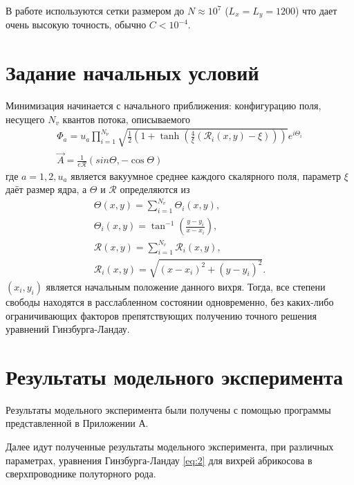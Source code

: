 В работе используются сетки размером до \( N \approx 10^7 \) 
(\( L_x = L_y = 1200 \)) что дает очень высокую точность, обычно 
\( C < 10^{-4} \). \cite{bib:minimization}

\section{Задание начальных условий}

Минимизация начинается с начального приближения: конфигурацию поля, несущего
\( N_v \) квантов потока, описываемого
\begin{gather}
    \Phi_a = u_a \prod\limits_{i=1}^{N_\nu} \sqrt{ 
        \frac{1}{2}\left( 1 + \tanh\left( 
            \frac{4}{\xi}\left( \mathcal{R}_i(x,y) - \xi \right)
        \right) \right)
    } e^{i\Theta_i}
    \nonumber \\
    \vec{A} = \frac{1}{e\mathcal{R}}\left( sin\Theta, -\cos\Theta \right)
    \label{eqm:6}
\end{gather}
где \( a = 1,2, u_a \) является вакуумное среднее каждого скалярного поля, 
параметр \( \xi \) даёт размер ядра, а \( \Theta \) и
\( \mathcal{R} \) определяются из
\begin{gather}
    \Theta(x,y) = \sum\limits_{i=1}^{N_v} \Theta_i(x,y), \nonumber \\
    \Theta_i(x,y) = \tan^{-1}\left(\frac{y-y_i}{x-x_i} \right), \nonumber \\
    \mathcal{R}(x,y) = \sum\limits_{i=1}^{N_v} \mathcal{R}_i(x,y), \nonumber \\
    \mathcal{R}_i(x,y) = \sqrt{(x-x_i)^2+(y-y_i)^2}.
\end{gather}
\( (x_i,y_i) \) является начальным положение данного вихря. Тогда, все степени 
свободы находятся в расслабленном состоянии одновременно, без каких-либо 
ограничивающих факторов препятствующих получению точного решения уравнений 
Гинзбурга-Ландау.
\cite{bib:minimization}

\newpage

\section{Результаты модельного эксперимента}

Результаты модельного эксперимента были получены с помощью программы 
представленной в Приложении А. 

Далее идут полученные результаты модельного эксперимента, при различных 
параметрах, уравнения Гинзбурга-Ландау \eqref{eq:2} для вихрей абрикосова в 
сверхпроводнике полуторного рода.

